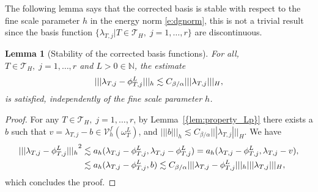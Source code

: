 \documentclass[10pt]{article}
\numberwithin{equation}{section}
\theoremstyle{plain}
\newtheorem{lemma}[theorem]{Lemma}
\theoremstyle{definition}
\theoremstyle{remark}
\begin{document}
The following lemma says that the corrected basis is stable with respect to the fine scale parameter $h$ in the energy norm \eqref{e:dgnorm}, this is not a trivial result since the basis function $\{\lambda_{T,j}|T\in{\mathcal{T}}_H,\;j=1,\ldots,r\}$ are discontinuous.
\begin{lemma}[Stability of the corrected basis functions]\label{l:stabbasis}
  For all, $T\in{\mathcal{T}}_H,\;j=1,\ldots,r$ and $L>0\in\mathbb{N}$, the estimate
  \begin{equation}\notag
    {||| {\lambda_{T,j}-\phi^L_{T,j}} |||_h} \lesssim {C_{{\beta}/{\alpha}}}{||| {\lambda_{T,j}} |||_H},
  \end{equation}
  is satisfied, independently of the fine scale parameter $h$.
\end{lemma}
\begin{proof} For any $T\in{\mathcal{T}}_H,\;j=1,\ldots,r$, by {Lemma~\ref{{lem:property_Lp}}} there exists a $b$ such that $v=\lambda_{T,j}-b\in{\mathcal{V}^f_h({\omega_T^L})}$, and ${||| {b} |||_h}\lesssim{C_{{\beta}/{\alpha}}}{||| {\lambda_{T,j}} |||_H}$. We have
  \begin{equation}\notag
    \begin{aligned}
    {||| {\lambda_{T,j}-\phi^L_{T,j}} |||_h}^2 &\lesssim {a_h({\lambda_{T,j}-\phi^L_{T,j}},{\lambda_{T,j}-\phi^L_{T,j}})}={a_h({\lambda_{T,j}-\phi^L_{T,j}},{\lambda_{T,j}-v})}, \\
&\lesssim {a_h({\lambda_{T,j}-\phi^L_{T,j}},{b})}\lesssim {C_{{\beta}/{\alpha}}}{||| {\lambda_{T,j}-\phi^L_{T,j}} |||_h}{||| {\lambda_{T,j}} |||_H},
    \end{aligned}
  \end{equation}
  which concludes the proof.
\end{proof}
\end{document}
